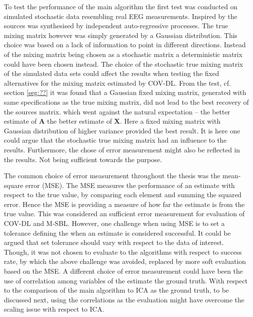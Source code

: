 To test the performance of the main algorithm the first test was conducted on simulated stochastic data resembling real EEG measurements. 
Inspired by \cite{cov} the sources was synthesised by independent auto-regressive processes. 
The true mixing matrix however was simply generated by a Gaussian distribution. 
This choice was based on a lack of information to point in different directions. 
Instead of the mixing matrix being chosen as a stochastic matrix a deterministic matrix could have been chosen instead. 
The choice of the stochastic true mixing matrix of the simulated data sets could affect the results when testing the fixed alternatives for the mixing matrix estimated by COV-DL. 
From the test, cf. section \ref{seg:??} it was found that a Gaussian fixed mixing matrix, generated with same specifications as the true mixing matrix, did not lead to the best recovery of the sources matrix.
which went against the natural expectation -- the better estimate of $\textbf{A}$ the better estimate of $\textbf{X}$. Here a fixed mixing matrix with Gaussian distribution of higher variance provided the best result. It is here one could argue that the stochastic true mixing matrix had an influence to the results.      
Furthermore, the chose of error measurement might also be reflected in the results. Not being sufficient towards the purpose. 

The common choice of error measurement throughout the thesis was the mean-square error (MSE). The MSE measures the performance of an estimate with respect to the true value, by comparing each element and summing the squared error. Hence the MSE is providing a measure of how far the estimate is from the true value. This was considered an sufficient error measurement for evaluation of COV-DL and M-SBL.
However, one challenge when using MSE is to set a tolerance defining the when an estimate is considered successful. It could be argued that set tolerance should vary with respect to the data of interest.
Though, it was not chosen to evaluate to the algorithms with respect to success rate, by which the above challenge was avoided, replaced by more soft evaluation based on the MSE.  
A different choice of error measurement could have been the use of correlation among variables of the estimate the ground truth. With respect to the comparison of the main algorithm to ICA as the ground truth, to be discussed next, using the correlations as the evaluation might have overcome the scaling issue with respect to ICA.    


